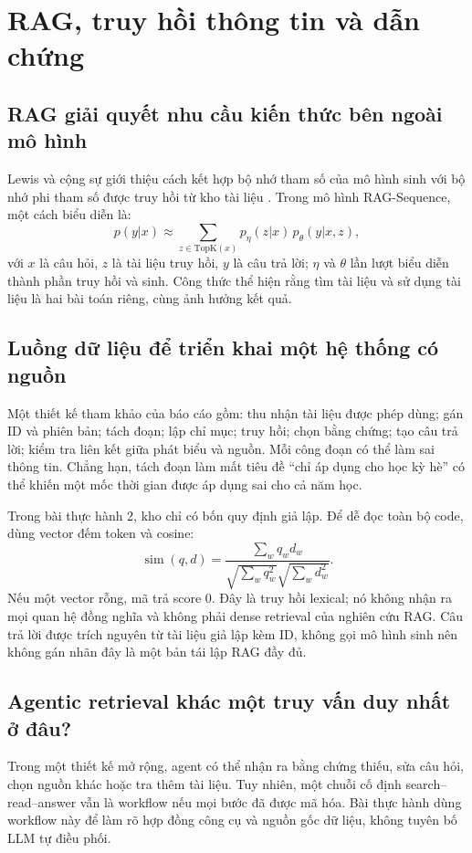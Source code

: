 \par
\section{RAG, truy hồi thông tin và dẫn chứng}
\subsection{RAG giải quyết nhu cầu kiến thức bên ngoài mô hình}
Lewis và cộng sự giới thiệu cách kết hợp bộ nhớ tham số của mô hình sinh với bộ nhớ
phi tham số được truy hồi từ kho tài liệu \cite{rag}. Trong mô hình RAG-Sequence,
một cách biểu diễn là:
\[
p(y|x)\approx\sum_{z\in\mathrm{TopK}(x)}p_{\eta}(z|x)\,p_{\theta}(y|x,z),
\]
với $x$ là câu hỏi, $z$ là tài liệu truy hồi, $y$ là câu trả lời; $\eta$ và $\theta$
lần lượt biểu diễn thành phần truy hồi và sinh. Công thức thể hiện rằng tìm tài liệu
và sử dụng tài liệu là hai bài toán riêng, cùng ảnh hưởng kết quả.

\subsection{Luồng dữ liệu để triển khai một hệ thống có nguồn}
Một thiết kế tham khảo của báo cáo gồm: thu nhận tài liệu được phép dùng; gán ID và
phiên bản; tách đoạn; lập chỉ mục; truy hồi; chọn bằng chứng; tạo câu trả lời; kiểm tra
liên kết giữa phát biểu và nguồn. Mỗi công đoạn có thể làm sai thông tin. Chẳng hạn,
tách đoạn làm mất tiêu đề ``chỉ áp dụng cho học kỳ hè'' có thể khiến một mốc thời gian
được áp dụng sai cho cả năm học.

Trong bài thực hành 2, kho chỉ có bốn quy định giả lập. Để dễ đọc toàn bộ code, dùng
vector đếm token và cosine:
\[
\operatorname{sim}(q,d)=\frac{\sum_w q_w d_w}{\sqrt{\sum_w q_w^2}\sqrt{\sum_w d_w^2}}.
\]
Nếu một vector rỗng, mã trả score 0. Đây là truy hồi lexical; nó không nhận ra mọi
quan hệ đồng nghĩa và không phải dense retrieval của nghiên cứu RAG. Câu trả lời được
trích nguyên từ tài liệu giả lập kèm ID, không gọi mô hình sinh nên không gán nhãn đây
là một bản tái lập RAG đầy đủ.

\subsection{Agentic retrieval khác một truy vấn duy nhất ở đâu?}
Trong một thiết kế mở rộng, agent có thể nhận ra bằng chứng thiếu, sửa câu hỏi, chọn
nguồn khác hoặc tra thêm tài liệu. Tuy nhiên, một chuỗi cố định search--read--answer
vẫn là workflow nếu mọi bước đã được mã hóa. Bài thực hành dùng workflow này để làm
rõ hợp đồng công cụ và nguồn gốc dữ liệu, không tuyên bố LLM tự điều phối.

